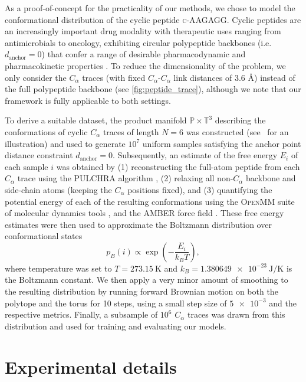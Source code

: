 As a proof-of-concept for the practicality of our methods, we chose to model the conformational distribution of the cyclic peptide \textsc{c-AAGAGG}.
Cyclic peptides are an increasingly important drug modality with therapeutic uses ranging from antimicrobials to oncology, exhibiting circular polypeptide backbones (i.e. $d_\text{anchor}=0$) that confer a range of desirable pharmacodynamic and pharmacokinetic properties \parencite{dougherty2019understanding}.
To reduce the dimensionality of the problem, we only consider the $C_\alpha$ traces (with fixed $C_\alpha$-$C_\alpha$ link distances of 3.6 \AA) instead of the full polypeptide backbone (see \cref{fig:peptide_trace}), although we note that our framework is fully applicable to both settings.

To derive a suitable dataset, the product manifold $\mathbb{P}\times\mathbb{T}^3$ describing the conformations of cyclic $C_\alpha$ traces of length $N=6$ was constructed (see~ for an illustration) and used to generate $10^7$ uniform samples satisfying the anchor point distance constraint $d_\text{anchor}=0$.
Subsequently, an estimate of the free energy $E_i$ of each sample $i$ was obtained by (1) reconstructing the full-atom peptide from each $C_\alpha$ trace using the \textsc{PULCHRA} algorithm \parencite{rotkiewicz2008fast}, (2) relaxing all non-$C_\alpha$ backbone and side-chain atoms (keeping the $C_\alpha$ positions fixed), and (3) quantifying the potential energy of each of the resulting conformations using the \textsc{OpenMM} suite of molecular dynamics tools \parencite{eastman2017openmm}, and the \textsc{AMBER} force field \parencite{hornak2006comparison}.
These free energy estimates were then used to approximate the Boltzmann distribution over conformational states $$ \textstyle{ p_B(i) \propto \exp\left(-\frac{E_i}{k_BT}\right),} $$ where temperature was set to $T=\SI{273.15}{\kelvin}$ and $k_B=\SI{1.380649e-23}{\joule\per\kelvin}$ is the Boltzmann constant.
We then apply a very minor amount of smoothing to the resulting distribution by running forward Brownian motion on both the polytope and the torus for 10 steps, using a small step size of $\num{5e-3}$ and the respective metrics.
Finally, a subsample of $10^6$ $C_\alpha$ traces was drawn from this distribution and used for training and evaluating our models.
\section{Experimental details}
\label{sec:exp_details}

